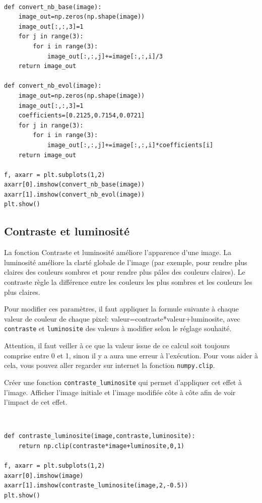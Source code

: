 \begin{solution}~\\
\vspace{-0.7cm}
\begin{verbatim}
def convert_nb_base(image):
    image_out=np.zeros(np.shape(image))
    image_out[:,:,3]=1
    for j in range(3):
        for i in range(3):
            image_out[:,:,j]+=image[:,:,i]/3
    return image_out

def convert_nb_evol(image):
    image_out=np.zeros(np.shape(image))
    image_out[:,:,3]=1
    coefficients=[0.2125,0.7154,0.0721]
    for j in range(3):
        for i in range(3):
            image_out[:,:,j]+=image[:,:,i]*coefficients[i]
    return image_out

f, axarr = plt.subplots(1,2)
axarr[0].imshow(convert_nb_base(image))
axarr[1].imshow(convert_nb_evol(image))
plt.show()
\end{verbatim} 
\end{solution}

\subsection{Contraste et luminosité}

La fonction Contraste et luminosité améliore l'apparence d'une image. La luminosité améliore la clarté globale de l'image (par exemple, pour rendre plus claires des couleurs sombres et pour rendre plus pâles des couleurs claires). Le contraste règle la différence entre les couleurs les plus sombres et les couleurs les plus claires.

Pour modifier ces paramètres, il faut appliquer la formule suivante à chaque valeur de couleur de chaque pixel: valeur=contraste*valeur+luminosite, avec 
\verb?contraste? et \verb?luminosite? des valeurs à modifier selon le réglage souhaité.

Attention, il faut veiller à ce que la valeur issue de ce calcul soit toujours comprise entre 0 et 1, sinon il y a aura une erreur à l'exécution. Pour vous aider à cela, vous pouvez aller regarder sur internet la fonction \verb?numpy.clip?.

\begin{exercice}
Créer une fonction \verb?contraste_luminosite? qui permet d'appliquer cet effet à l'image. Afficher l'image initiale et l'image modifiée côte à côte afin de voir l'impact de cet effet.
\end{exercice}
 
\begin{solution}~\\
\vspace{-0.7cm}
\begin{verbatim}
def contraste_luminosite(image,contraste,luminosite):
    return np.clip(contraste*image+luminosite,0,1)

f, axarr = plt.subplots(1,2)
axarr[0].imshow(image)
axarr[1].imshow(contraste_luminosite(image,2,-0.5))
plt.show()
\end{verbatim} 
\end{solution}

